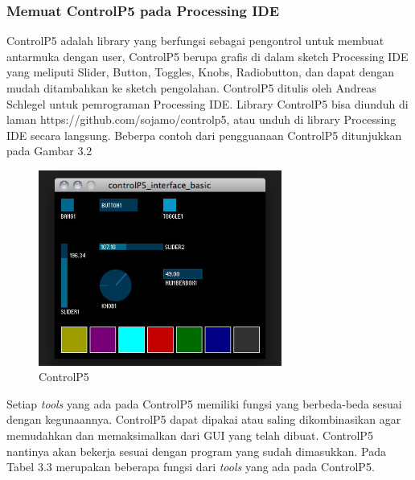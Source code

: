 \subsubsection{ Memuat ControlP5 pada Processing IDE }
ControlP5 adalah library yang berfungsi sebagai pengontrol untuk membuat antarmuka dengan user, ControlP5 berupa grafis di dalam sketch Processing IDE yang meliputi Slider, Button, Toggles, Knobs, Radiobutton, dan dapat dengan mudah ditambahkan ke sketch pengolahan. ControlP5 ditulis oleh Andreas Schlegel untuk pemrograman Processing IDE. Library ControlP5 bisa diunduh di laman https://github.com/sojamo/controlp5, atau unduh di library Processing IDE secara langsung. Beberpa contoh dari pengguanaan ControlP5 ditunjukkan pada Gambar 3.2
	\begin{figure}[H]
	\centering
	\includegraphics[width=8cm]{gambar/controlp5.jpg}
	\caption{ControlP5}
\end{figure}
Setiap \textit{tools} yang ada pada ControlP5 memiliki fungsi yang berbeda-beda sesuai dengan kegunaannya. ControlP5 dapat dipakai atau saling dikombinasikan agar memudahkan dan memaksimalkan dari GUI yang telah dibuat. ControlP5 nantinya akan bekerja sesuai dengan program yang sudah dimasukkan. Pada Tabel 3.3 merupakan beberapa fungsi dari \textit{tools} yang ada pada ControlP5.
